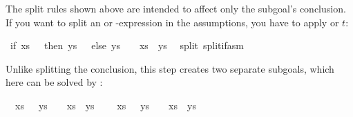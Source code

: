 \begin{isabellebody}
\begin{isamarkuptext}
The split rules shown above are intended to affect only the subgoal's
conclusion.  If you want to split an  or -expression
in the assumptions, you have to apply  or
$t$:%
\end{isamarkuptext}%
\isamarkuptrue%
\isamarkupfalse%
\ {}if\ xs\ {}\ {}{}\ then\ ys\ {}\ {}{}\ else\ ys\ {}\ {}{}\ {}\ xs\ {}\ ys\ {}\ {}{}{}\isanewline
%
\isadelimproof
%
\endisadelimproof
%
\isatagproof
{}\isamarkupfalse%
{}split\ split{}if{}asm{}%
\begin{isamarkuptxt}%
\noindent
Unlike splitting the conclusion, this step creates two
separate subgoals, which here can be solved by :
\begin{isabelle}%
\ {}{}\ {}xs\ {}\ {}{}{}\ ys\ {}\ {}{}{}\ {}\ xs\ {}\ ys\ {}\ {}{}\isanewline
\ {}{}\ {}xs\ {}\ {}{}{}\ ys\ {}\ {}{}{}\ {}\ xs\ {}\ ys\ {}\ {}{}%

\end{isabelle}
\end{isamarkuptxt}
\end{isabellebody}
